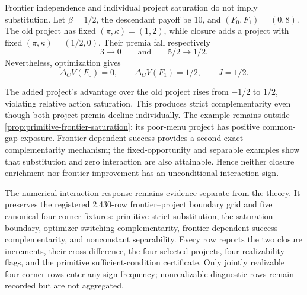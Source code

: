 \begin{proposition}
\label{prop:t7-interaction-examples}
Frontier independence and individual project saturation do not imply
substitution.  Let \(\beta=1/2\), the descendant payoff be \(10\), and
\((F_0,F_1)=(0,8)\).  The old project has fixed
\((\pi,\kappa)=(1,2)\), while closure adds a project with fixed
\((\pi,\kappa)=(1/2,0)\).  Their premia fall respectively
\[
  3\to0
  \qquad\text{and}\qquad
  5/2\to1/2.
\]
Nevertheless, optimization gives
\[
  \Delta_CV(F_0)=0,\qquad
  \Delta_CV(F_1)=1/2,\qquad
  J=1/2.
\]
\end{proposition}

The added project's advantage over the old project rises from
\(-1/2\) to \(1/2\), violating relative action saturation.  This produces
strict complementarity even though both project premia decline individually.
The example remains outside
\cref{prop:primitive-frontier-saturation}: its poor-menu project has positive
common-gap exposure.  Frontier-dependent success provides a second exact
complementarity mechanism; the fixed-opportunity and separable examples show
that substitution and zero interaction are also attainable.  Hence neither
closure enrichment nor frontier improvement has an unconditional interaction
sign.

The numerical interaction response remains evidence separate from the
theory.  It preserves the registered 2,430-row frontier--project boundary grid
and five canonical four-corner fixtures: primitive strict substitution, the
saturation boundary, optimizer-switching complementarity,
frontier-dependent-success complementarity, and nonconstant separability.
Every row reports the two closure increments, their cross difference, the
four selected projects, four realizability flags, and the primitive
sufficient-condition certificate.  Only jointly realizable four-corner rows
enter any sign frequency; nonrealizable diagnostic rows remain recorded but
are not aggregated.
